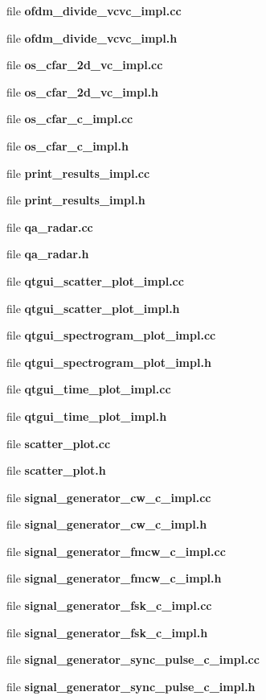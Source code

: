 \begin{DoxyCompactItemize}
\item 
file {\bf ofdm\+\_\+divide\+\_\+vcvc\+\_\+impl.\+cc}
\item 
file {\bf ofdm\+\_\+divide\+\_\+vcvc\+\_\+impl.\+h}
\item 
file {\bf os\+\_\+cfar\+\_\+2d\+\_\+vc\+\_\+impl.\+cc}
\item 
file {\bf os\+\_\+cfar\+\_\+2d\+\_\+vc\+\_\+impl.\+h}
\item 
file {\bf os\+\_\+cfar\+\_\+c\+\_\+impl.\+cc}
\item 
file {\bf os\+\_\+cfar\+\_\+c\+\_\+impl.\+h}
\item 
file {\bf print\+\_\+results\+\_\+impl.\+cc}
\item 
file {\bf print\+\_\+results\+\_\+impl.\+h}
\item 
file {\bf qa\+\_\+radar.\+cc}
\item 
file {\bf qa\+\_\+radar.\+h}
\item 
file {\bf qtgui\+\_\+scatter\+\_\+plot\+\_\+impl.\+cc}
\item 
file {\bf qtgui\+\_\+scatter\+\_\+plot\+\_\+impl.\+h}
\item 
file {\bf qtgui\+\_\+spectrogram\+\_\+plot\+\_\+impl.\+cc}
\item 
file {\bf qtgui\+\_\+spectrogram\+\_\+plot\+\_\+impl.\+h}
\item 
file {\bf qtgui\+\_\+time\+\_\+plot\+\_\+impl.\+cc}
\item 
file {\bf qtgui\+\_\+time\+\_\+plot\+\_\+impl.\+h}
\item 
file {\bf scatter\+\_\+plot.\+cc}
\item 
file {\bf scatter\+\_\+plot.\+h}
\item 
file {\bf signal\+\_\+generator\+\_\+cw\+\_\+c\+\_\+impl.\+cc}
\item 
file {\bf signal\+\_\+generator\+\_\+cw\+\_\+c\+\_\+impl.\+h}
\item 
file {\bf signal\+\_\+generator\+\_\+fmcw\+\_\+c\+\_\+impl.\+cc}
\item 
file {\bf signal\+\_\+generator\+\_\+fmcw\+\_\+c\+\_\+impl.\+h}
\item 
file {\bf signal\+\_\+generator\+\_\+fsk\+\_\+c\+\_\+impl.\+cc}
\item 
file {\bf signal\+\_\+generator\+\_\+fsk\+\_\+c\+\_\+impl.\+h}
\item 
file {\bf signal\+\_\+generator\+\_\+sync\+\_\+pulse\+\_\+c\+\_\+impl.\+cc}
\item 
file {\bf signal\+\_\+generator\+\_\+sync\+\_\+pulse\+\_\+c\+\_\+impl.\+h}

\end{DoxyCompactItemize}
